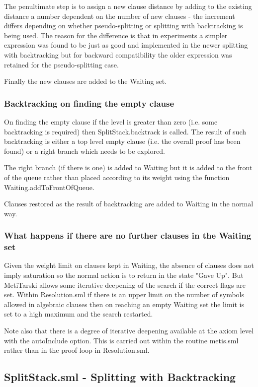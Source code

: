 \documentclass[11pt, oneside]{article}   	%
\begin{document}
The penultimate step is to assign a new clause distance by adding to the existing distance a number dependent on the number of new clauses - the increment differs depending on whether pseudo-splitting
or splitting with backtracking is being used. The reason for the difference is that in experiments a simpler expression was found to be just as good and implemented in the newer splitting with backtracking but
for backward compatibility the older expression was retained for the pseudo-splitting case.

Finally the new clauses are added to the Waiting set.

\subsubsection{Backtracking on finding the empty clause}
On finding the empty clause if the level is greater than zero (i.e. some backtracking is required) then SplitStack.backtrack is called.
The result of such backtracking is either a top level empty clause (i.e. the overall proof has been found) or a right branch which needs to be explored.

The right branch (if there is one) is added to Waiting but it is added to the front of the queue rather than placed according to its weight using the function
Waiting.addToFrontOfQueue.

Clauses restored as the result of backtracking are added to Waiting in the normal way.

\subsubsection{What happens if there are no further clauses in the Waiting set}
Given the weight limit on clauses kept in Waiting, the absence of clauses does not imply saturation so the normal action is to return in the state "Gave Up". But
MetiTarski allows some iterative deepening of the search if the correct flags are set. Within Resolution.sml if there is an upper limit on the number of symbols
allowed in algebraic clauses then on reaching an empty Waiting set the limit is set to a high maximum and the search restarted.

Note also that there is a degree of iterative deepening available at the axiom level with the autoInclude option. This is carried out within the routine metis.sml rather
than in the proof loop in Resolution.sml.


\subsection{SplitStack.sml - Splitting with Backtracking}
\end{document}
